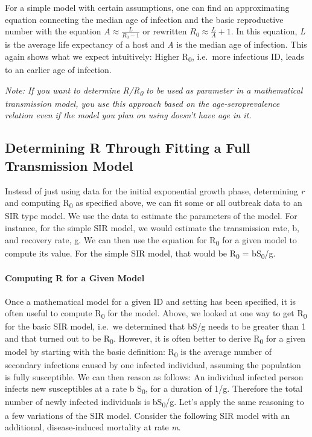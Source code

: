 \documentclass[]{article}
\let\oldparagraph\paragraph
\renewcommand{\paragraph}[1]{\oldparagraph{#1}\mbox{}}
\theoremstyle{definition}
\theoremstyle{definition}
\theoremstyle{definition}
\theoremstyle{remark}
\begin{document}
For a simple model with certain assumptions, one can find an
approximating equation connecting the median age of infection and the
basic reproductive number with the equation
\(A \approx \frac {L}{R_0 - 1}\) or rewritten
\(R_0 \approx \frac{L}{A} + 1\). In this equation, \emph{L} is the
average life expectancy of a host and \emph{A} is the median age of
infection. This again shows what we expect intuitively: Higher
R\textsubscript{0}, i.e.~more infectious ID, leads to an earlier age of
infection.

\emph{Note: If you want to determine R/R\textsubscript{0} to be used as
parameter in a mathematical transmission model, you use this approach
based on the age-seroprevalence relation even if the model you plan on
using doesn't have age in it.}

\subsection{Determining R Through Fitting a Full Transmission
Model}\label{determining-r-through-fitting-a-full-transmission-model}

Instead of just using data for the initial exponential growth phase,
determining \emph{r} and computing R\textsubscript{0} as specified
above, we can fit some or all outbreak data to an SIR type model. We use
the data to estimate the parameters of the model. For instance, for the
simple SIR model, we would estimate the transmission rate, b, and
recovery rate, g. We can then use the equation for R\textsubscript{0}
for a given model to compute its value. For the simple SIR model, that
would be R\textsubscript{0} = bS\textsubscript{0}/g.

\paragraph{Computing R for a Given Model}\label{myadvancedbox}

Once a mathematical model for a given ID and setting has been specified,
it is often useful to compute R\textsubscript{0} for the model. Above,
we looked at one way to get R\textsubscript{0} for the basic SIR model,
i.e.~we determined that bS/g needs to be greater than 1 and that turned
out to be R\textsubscript{0}. However, it is often better to derive
R\textsubscript{0} for a given model by starting with the basic
definition: R\textsubscript{0} is the average number of secondary
infections caused by one infected individual, assuming the population is
fully susceptible. We can then reason as follows: An individual infected
person infects new susceptibles at a rate b S\textsubscript{0}, for a
duration of 1/g. Therefore the total number of newly infected
individuals is bS\textsubscript{0}/g. Let's apply the same reasoning to
a few variations of the SIR model. Consider the following SIR model with
an additional, disease-induced mortality at rate \emph{m}.
\end{document}
